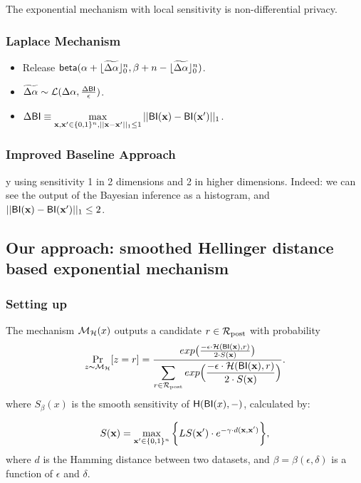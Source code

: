 \documentclass[sigconf]{acmart}
\begin{document}
The exponential mechanism with local sensitivity is non-differential privacy\cite{dwork2014algorithmic}.



\subsubsection{Laplace Mechanism}
\begin{itemize}
  \item Release $\mathsf{beta}(\alpha +  \lfloor\widetilde{\Delta \alpha}\rfloor^n_0,\beta + n - \lfloor\widetilde{\Delta \alpha}\rfloor^n_0)$.
  \item $\widetilde{\Delta \alpha}\sim \mathcal{L}(\Delta\alpha, \frac{\Delta \mathsf{BI}}{\epsilon})$.
  \item $\Delta \mathsf{BI} \equiv \max\limits_{\textbf{x}, \textbf{x}' \in \{0,1\}^{n}, ||\textbf{x} - \textbf{x}'||_1 \leq 1} ||\mathsf{BI}(\textbf{x}) - \mathsf{BI}(\textbf{x}')||_1$.
  \end{itemize}



\subsubsection{Improved Baseline Approach}

y using sensitivity 1 in 2 dimensions and 2 in higher dimensions.
    Indeed: we can see the output of the Bayesian inference as a histogram, and $||\mathsf{BI}(\textbf{x})-\mathsf{BI}(\textbf{x}')||_1 \leq 2$.


\subsection{Our approach: smoothed Hellinger distance based exponential mechanism}
\label{sec_smoo}

\subsubsection{Setting up}

\begin{definition}
\label{def_smoo}
The mechanism $\mathcal{M}_{\mathcal{H}}(x)$ outputs a candidate $r \in \mathcal{R}_{\textup{post}}$ with probability
\begin{equation*}
\underset{z \thicksim \mathcal{M}_{\mathcal{H}}}{\Pr}[z=r] = \frac {exp\big(\frac{-\epsilon\cdot\mathcal{H}(\mathsf{BI}(\textbf{x}),r)}{2\cdot S(\textbf{x})}\big)}
{\displaystyle\sum_{r\in\mathcal{R}_{\textup{post}}} exp\Big(\frac{-\epsilon\cdot\mathcal{H}(\mathsf{BI}(\textbf{x}),r)}{2\cdot S(\textbf{x})}\Big)}.
\end{equation*}
where $S_\beta(x)$ is the smooth sensitivity of $\mathsf{H}(\mathsf{BI}(x),-)$, calculated by:

\begin{equation}
  \label{eq:smooth}
   S(\textbf{x})=\max_{\textbf{x}' \in \{0,1\}^{n}}\bigg \{LS(\textbf{x}') \cdot e^{-\gamma\cdot d(\textbf{x},\textbf{x}')}\bigg\},
\end{equation}
where $d$ is the Hamming distance between two datasets, and $\beta =
\beta(\epsilon, \delta)$ is a function of $\epsilon$ and $\delta$. 
\end{definition}
\end{document}

